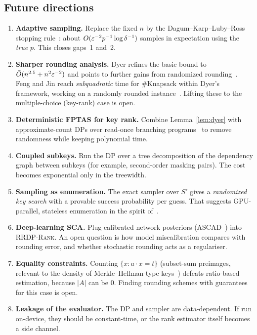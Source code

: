 \subsection{Future directions}
\begin{enumerate}[leftmargin=*]
\item \textbf{Adaptive sampling.} Replace the fixed $n$ by the Dagum--Karp--Luby--Ross stopping rule~\cite{dklr2000}: about
      $O(\varepsilon^{-2}p^{-1}\log\delta^{-1})$ samples in expectation using the \emph{true} $p$. This closes gaps~1 and~2.
\item \textbf{Sharper rounding analysis.} Dyer refines the basic bound to $\tilde O(n^{2.5}+n^2\varepsilon^{-2})$ and points to further gains
      from randomized rounding~\cite{dyer2003}. Feng and Jin reach \emph{subquadratic} time for \#Knapsack within Dyer's framework,
      working on a randomly rounded instance~\cite{feng2025}. Lifting these to the multiple-choice (key-rank) case is open.
\item \textbf{Deterministic FPTAS for key rank.} Combine Lemma~\ref{lem:dyer} with approximate-count DPs over read-once branching
      programs~\cite{gopalan2011,stefankovic2012} to remove randomness while keeping polynomial time.
\item \textbf{Coupled subkeys.} Run the DP over a tree decomposition of the dependency graph between subkeys (for example,
      second-order masking pairs). The cost becomes exponential only in the treewidth.
\item \textbf{Sampling as enumeration.} The exact sampler over $S'$ gives a \emph{randomized key search} with a provable
      success probability per guess. That suggests GPU-parallel, stateless enumeration in the spirit of~\cite{martin2015,poussier2016}.
\item \textbf{Deep-learning SCA.} Plug calibrated network posteriors (ASCAD~\cite{benadjila2020}) into \textsc{RRDP-Rank}. An open question is
      how model miscalibration compares with rounding error, and whether stochastic rounding acts as a regulariser.
\item \textbf{Equality constraints.} Counting $\{x: a\cdot x=t\}$ (subset-sum preimages, relevant to the density of
      Merkle--Hellman-type keys~\cite{merkle1978,lagarias1985}) defeats ratio-based estimation, because $|A|$ can be $0$. Finding rounding schemes with
      guarantees for this case is open.
\item \textbf{Leakage of the evaluator.} The DP and sampler are data-dependent. If run on-device, they should be
      constant-time, or the rank estimator itself becomes a side channel.
\end{enumerate}
